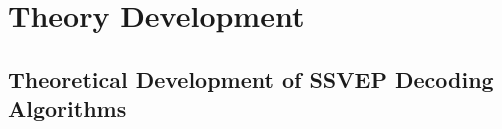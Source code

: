 \chapter{Theory Development}

\graphicspath{ {report/Chapter3/assets/} } 

\section{Theoretical Development of SSVEP Decoding Algorithms}